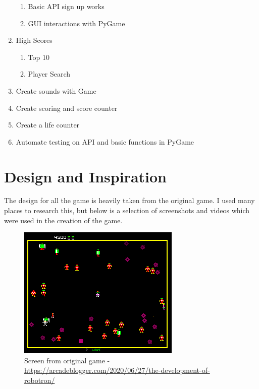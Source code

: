 \documentclass[a4paper, 11pt]{report}
\begin{document}
\begin{enumerate}
\begin{enumerate}
            \item Basic API sign up works
            \item GUI interactions with PyGame
        \end{enumerate}
    \item High Scores
        \begin{enumerate}
            \item Top 10
            \item Player Search
        \end{enumerate}
    \item Create sounds with Game
    \item Create scoring and score counter
    \item Create a life counter
    \item Automate testing on API and basic functions in PyGame
\end{enumerate}

\section{Design and Inspiration}
The design for all the game is heavily taken from the original game. I used many places to research this, but below is a selection of screenshots and videos which were used in the creation of the game.
\begin{figure}[h!]
  \includegraphics[width=0.8\linewidth]{design1.png}
  \centering
  \caption{Screen from original game - \url{https://arcadeblogger.com/2020/06/27/the-development-of-robotron/}}
  \label{fig:Design 1}
\end{figure}
\end{document}
